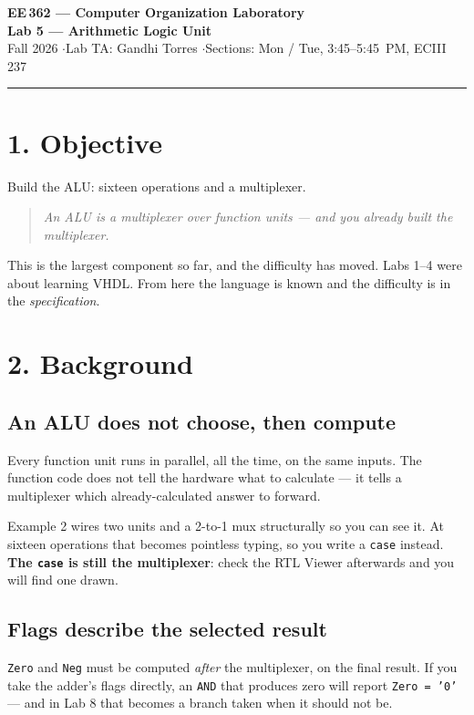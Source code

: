 \documentclass[11pt]{article}
\newcommand{\code}[1]{\texttt{#1}}
\newcommand{\hr}{\vspace{2pt}\hrule\vspace{6pt}}
\begin{document}
\begin{center}
{\Large\bfseries EE\,362 --- Computer Organization Laboratory}\\[2pt]
{\large\bfseries Lab 5 --- Arithmetic Logic Unit}\\[4pt]
Fall 2026 \quad$\cdot$\quad Lab TA: Gandhi Torres \quad$\cdot$\quad Sections: Mon / Tue, 3:45--5:45~PM, ECIII 237
\end{center}
\hr

\section*{1. Objective}

Build the ALU: sixteen operations and a multiplexer.

\begin{quote}
\emph{An ALU is a multiplexer over function units --- and you already built the
multiplexer.}
\end{quote}

This is the largest component so far, and the difficulty has moved. Labs 1--4
were about learning VHDL. From here the language is known and the difficulty is
in the \emph{specification}.

\section*{2. Background}

\subsection*{An ALU does not choose, then compute}

Every function unit runs in parallel, all the time, on the same inputs. The
function code does not tell the hardware what to calculate --- it tells a
multiplexer which already-calculated answer to forward.

Example 2 wires two units and a 2-to-1 mux structurally so you can see it. At
sixteen operations that becomes pointless typing, so you write a \code{case}
instead. \textbf{The \code{case} is still the multiplexer}: check the RTL Viewer
afterwards and you will find one drawn.

\subsection*{Flags describe the selected result}

\code{Zero} and \code{Neg} must be computed \emph{after} the multiplexer, on the
final result. If you take the adder's flags directly, an \code{AND} that produces
zero will report \code{Zero = '0'} --- and in Lab 8 that becomes a branch taken
when it should not be.
\end{document}

